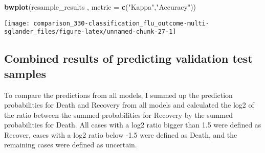 \documentclass[]{book}
\newenvironment{Shaded}{\begin{snugshade}}{\end{snugshade}}
\newcommand{\DataTypeTok}[1]{\textcolor[rgb]{0.13,0.29,0.53}{#1}}
\newcommand{\KeywordTok}[1]{\textcolor[rgb]{0.13,0.29,0.53}{\textbf{#1}}}
\newcommand{\NormalTok}[1]{#1}
\newcommand{\StringTok}[1]{\textcolor[rgb]{0.31,0.60,0.02}{#1}}
\begin{document}
\begin{Shaded}
\begin{Highlighting}[]
\KeywordTok{bwplot}\NormalTok{(resample_results , }\DataTypeTok{metric =} \KeywordTok{c}\NormalTok{(}\StringTok{"Kappa"}\NormalTok{,}\StringTok{"Accuracy"}\NormalTok{))}
\end{Highlighting}
\end{Shaded}

\begin{center}\texttt{[image: comparison\_330-classification\_flu\_outcome-multi-sglander\_files/figure-latex/unnamed-chunk-27-1]} \end{center}

\hypertarget{combined-results-of-predicting-validation-test-samples}{%
\subsection{Combined results of predicting validation test samples}\label{combined-results-of-predicting-validation-test-samples}}

To compare the predictions from all models, I summed up the prediction probabilities for Death and Recovery from all models and calculated the log2 of the ratio between the summed probabilities for Recovery by the summed probabilities for Death. All cases with a log2 ratio bigger than 1.5 were defined as Recover, cases with a log2 ratio below -1.5 were defined as Death, and the remaining cases were defined as uncertain.
\end{document}
